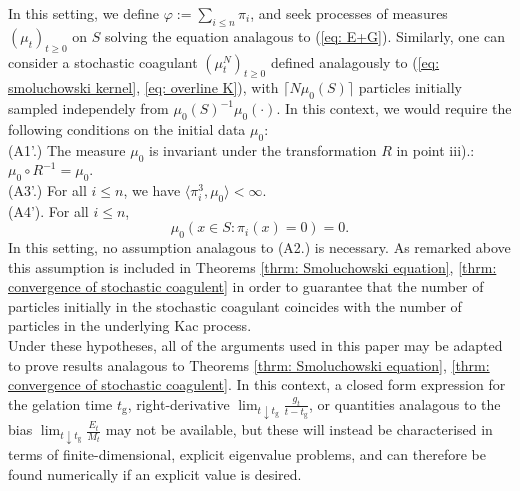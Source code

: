 \documentclass[11pt, notitlepage]{article}
\begin{document}
In this setting, we define $\varphi:=\sum_{i\le n} \pi_i$, and seek processes of measures $(\mu_t)_{t\ge 0}$ on $S$ solving the equation analagous to (\ref{eq: E+G}). Similarly, one can consider a stochastic coagulant $(\mu^N_t)_{t\ge 0}$ defined analagously to (\ref{eq: smoluchowski kernel}, \ref{eq: overline K}), with $\lceil N \mu_0(S)\rceil$ particles initially sampled independely from $\mu_0(S)^{-1}\mu_0(\cdot)$. In this context, we would require the following conditions on the initial data $\mu_0$: 
\\ (A1'.) The measure $\mu_0$ is invariant under the transformation $R$ in point iii).: $\mu_0\circ R^{-1}=\mu_0.$
\\ (A3'.) For all $i\le n$, we have $\langle \pi_i^3, \mu_0\rangle <\infty.$
\\ (A4'). For all $i \le n$, \begin{equation} \mu_0(x\in S: \pi_i(x)=0)=0.\end{equation} In this setting, no assumption analagous to (A2.) is necessary. As remarked above this assumption is included in Theorems \ref{thrm: Smoluchowski equation}, \ref{thrm: convergence of stochastic coagulent} in order to guarantee that the number of particles initially in the stochastic coagulant coincides with the number of particles in the underlying Kac process. \medskip \\ Under these hypotheses, all of the arguments used in this paper may be adapted to prove results analagous to Theorems \ref{thrm: Smoluchowski equation}, \ref{thrm: convergence of stochastic coagulent}. In this context, a closed form expression for the gelation time $t_\mathrm{g}$, right-derivative $\lim_{t\downarrow t_\mathrm{g}} \frac{g_t}{t-t_\mathrm{g}}$, or quantities analagous to the bias $\lim_{t\downarrow t_\mathrm{g}} \frac{E_t}{M_t}$ may not be available, but these will instead be characterised in terms of finite-dimensional, explicit eigenvalue problems, and can therefore be found numerically if an explicit value is desired.
\end{document}
